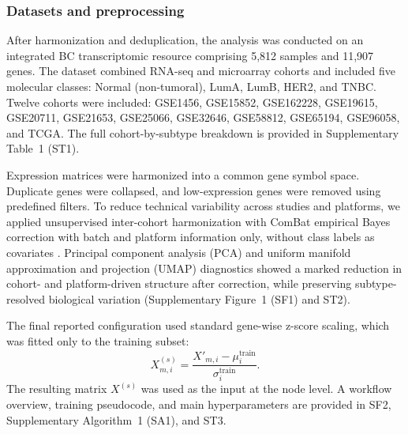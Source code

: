 \documentclass[unnumsec,webpdf,modern,large]{oup-authoring-template}
\begin{document}
\subsubsection{Datasets and preprocessing}
After harmonization and deduplication, the analysis was conducted on an integrated BC transcriptomic resource comprising 5,812 samples and 11,907 genes. The dataset combined RNA-seq and microarray cohorts and included five molecular classes: Normal (non-tumoral), LumA, LumB, HER2, and TNBC. Twelve cohorts were included: GSE1456, GSE15852, GSE162228, GSE19615, GSE20711, GSE21653, GSE25066, GSE32646, GSE58812, GSE65194, GSE96058, and TCGA. The full cohort-by-subtype breakdown is provided in Supplementary Table~1 (ST1).

Expression matrices were harmonized into a common gene symbol space. Duplicate genes were collapsed, and low-expression genes were removed using predefined filters. To reduce technical variability across studies and platforms, we applied unsupervised inter-cohort harmonization with ComBat empirical Bayes correction with batch and platform information only, without class labels as covariates \citep{Johnson2007ComBat}. Principal component analysis (PCA) and uniform manifold approximation and projection (UMAP) diagnostics showed a marked reduction in cohort- and platform-driven structure after correction, while preserving subtype-resolved biological variation (Supplementary Figure~1 (SF1) and ST2).

The final reported configuration used standard gene-wise z-score scaling, which was fitted only to the training subset:
\[
X^{(s)}_{m,i}=\frac{X'_{m,i}-\mu_i^{\mathrm{train}}}{\sigma_i^{\mathrm{train}}}.
\]
 The resulting matrix \(X^{(s)}\) was used as the input at the node level. A workflow overview, training pseudocode, and main hyperparameters are provided in SF2, Supplementary Algorithm~1 (SA1), and ST3.
\end{document}
